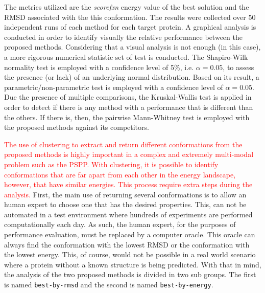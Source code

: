 The metrics utilized are the \textit{scorefxn} energy value of the
best solution and the \ac{RMSD} associated with the this conformation. The
results were collected over 50 independent runs of each method for each target
protein. A graphical analysis is conducted in order to identify visually the
relative performance between the proposed methods. Considering that a visual
analysis is not enough (in this case), a more rigorous numerical statistic set
of test is conducted. The Shapiro-Wilk~\cite{wilk1968joint} normality test is
employed with a confidence level of 5\%, i.e. $\alpha = 0.05$, to assess the
presence (or lack) of an underlying normal distribution. Based on its result, a
parametric/non-parametric test is employed with a confidence level of $\alpha =
0.05$. Due the presence of multiple comparisons, the Kruskal-Wallis test is
applied in order to detect if there is any method with a performance that
is different than the others. If there is, then, the pairwise Mann-Whitney test is
employed with the proposed methods against its competitors.

\textcolor{red}{
The use of clustering to extract and return different conformations from the
proposed methods is highly important in a complex and extremely multi-modal
problem such as the PSPP. With clustering, it is possible to identify conformations
that are far apart from each other in the energy landscape, however, that have
similar energies. This process require extra steps during the analysis.}
First, the main use of
returning several conformations is to allow an human expert to choose one that
has the desired properties. This, can not be automated in a test environment where
hundreds of experiments are performed computationally each day. As such, the human
expert, for the purposes of performance evaluation, must be replaced by a
computer oracle. This oracle can always find the conformation with the lowest
RMSD or the conformation with the lowest energy. This, of course, would not
be possible in a real world scenario where a protein without a known structure is
being predicted. With that in mind, the analysis of the two proposed methods is
divided in two sub groups. The first is named \texttt{best-by-rmsd} and the second
is named \texttt{best-by-energy}.

